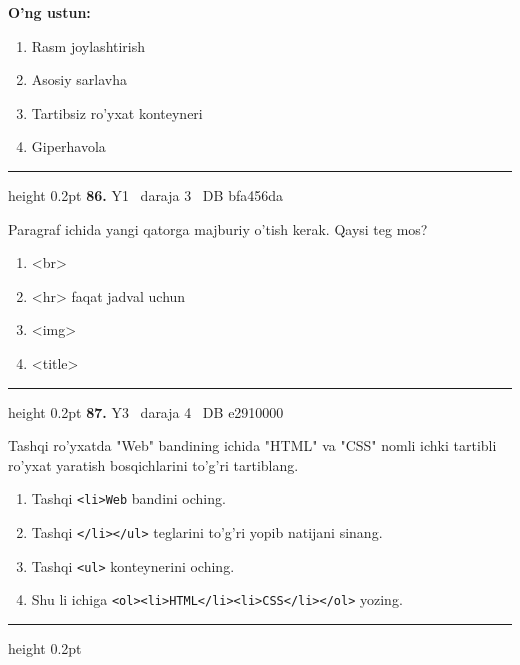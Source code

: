 \documentclass[10pt,a4paper,oneside]{article}
\begin{document}
\textbf{\footnotesize O'ng ustun:}
\begin{enumerate}[label=\Alph*),leftmargin=9mm]
\item Rasm joylashtirish
\item Asosiy sarlavha
\item Tartibsiz ro'yxat konteyneri
\item Giperhavola
\end{enumerate}
\vspace{2mm}\hrule height 0.2pt \vspace{4mm}
\hypertarget{q86}{\textbf{\color{ink}86.}}  {\color{muted}\scriptsize Y1 \textbullet\ daraja 3 \textbullet\ DB bfa456da}
\par
Paragraf ichida yangi qatorga majburiy o'tish kerak. Qaysi teg mos?
\begin{enumerate}[label=\Alph*),leftmargin=9mm]
\item \textless{}br\textgreater{}
\item \textless{}hr\textgreater{} faqat jadval uchun
\item \textless{}img\textgreater{}
\item \textless{}title\textgreater{}
\end{enumerate}
\vspace{2mm}\hrule height 0.2pt \vspace{4mm}
\hypertarget{q87}{\textbf{\color{ink}87.}}  {\color{muted}\scriptsize Y3 \textbullet\ daraja 4 \textbullet\ DB e2910000}
\par
Tashqi ro'yxatda "Web" bandining ichida "HTML" va "CSS" nomli ichki tartibli ro'yxat yaratish bosqichlarini to'g'ri tartiblang.
\begin{enumerate}[label=\Alph*),leftmargin=9mm]
\item Tashqi \texttt{\textless{}li\textgreater{}Web} bandini oching.
\item Tashqi \texttt{\textless{}/li\textgreater{}\textless{}/ul\textgreater{}} teglarini to'g'ri yopib natijani sinang.
\item Tashqi \texttt{\textless{}ul\textgreater{}} konteynerini oching.
\item Shu li ichiga \texttt{\textless{}ol\textgreater{}\textless{}li\textgreater{}HTML\textless{}/li\textgreater{}\textless{}li\textgreater{}CSS\textless{}/li\textgreater{}\textless{}/ol\textgreater{}} yozing.
\end{enumerate}
\vspace{2mm}\hrule height 0.2pt \vspace{4mm}
\end{document}
